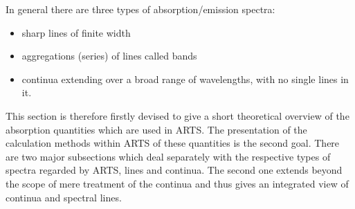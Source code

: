 \def\alphacpl{\alpha^{\mbox{\rm \small CP98}}_{\mbox{\small $\ell$}}} 
%
\def\alphampmoc{\alpha^{\mbox{\rm \small MPM87}}_{\rm c}} 
\def\alphampmmc{\alpha^{\mbox{\rm \small MPM89}}_{\rm c}} 
\def\alphampmnc{\alpha^{\mbox{\rm \small MPM93}}_{\rm c}} 
\def\alphapwrc{\alpha^{\mbox{\rm \small R98}}_{\rm c}} 
\def\alphacpc{\alpha^{\mbox{\rm \small CP98}}_{\rm c}} 
%
\def\gamk{\gamma_{\mbox{\rm \small k}}}
\def\gamc{\gamma_{\mbox{\rm \small c}}}
%
\def\ws{w_{\mbox{\rm \small s,k}}}
\def\xs{x_{\mbox{\rm \small s,k}}}
\def\wf{w_{\mbox{\rm \small f,k}}}
\def\xf{x_{\mbox{\rm \small f,k}}}
%
\def\wn{\bar{\nu}}
\def\nucc{\nu_{\mbox{\rm \small c}}}
\def\nucut{\nu_{\mbox{\rm \small cutoff}}}
\def\nuo{\nu_{\mbox{\rm \small 0}}}
\def\nuk{\nu_{\mbox{\rm \small k}}}
%
\def\shape{F(\nu,\nuk)}
\def\shapec{F_{c}(\nu,\nuk)}
\def\shapefp{f_{c}(\nu,+\nuk)}
\def\shapefm{f_{c}(\nu,-\nuk)}
\def\shapefpm{f_{c}(\nu,\pm\nuk)}
\def\inten{S_{\mbox{\rm \small k}}(T)}
\def\inteno{S_{\mbox{\rm \small k}}(300\,K)}
\def\intencp{S_{\mbox{\rm \small 0}}(T)}
%
\def\cx{C_{\mbox{\rm \small x}}}
\def\cs{C_{\mbox{\rm \small H}_{2}\mbox{\rm \small O}}} 
\def\cf{C_{\mbox{\rm N}_{2}}} 
\def\cxo{C^{\mbox{\rm o}}_{\mbox{\rm \small X}}} 
\def\cso{C^{\mbox{\rm o}}_{\mbox{\rm \small H}_{2}\mbox{\rm \small O}}} 
\def\cfo{C^{\mbox{\rm o}}_{\mbox{\rm \small N}_{2}}} 
\def\cao{C^{\mbox{\rm o}}_{\mbox{\rm \small air}}}
\def\cdo{C^{\mbox{\rm o}}_{\mbox{\rm \small d}}}
\def\xx{{\rm n}_{\mbox{\rm \small  x}}} 
\def\xs{{\rm n}_{\mbox{\rm \small  s}}} 
\def\xf{{\rm n}_{\mbox{\rm \small  f}}} 
\def\xd{{\rm n}_{\mbox{\rm \small  d}}}
%


                                          

In general there are three types of absorption/emission spectra:
\begin{itemize}
\item sharp lines of finite width
\item aggregations (series) of lines called bands
\item continua extending over a broad range of wavelengths, with
      no single lines in it.
\end{itemize}
This section is therefore firstly devised to give a short theoretical
overview of the absorption quantities which are used in ARTS. The
presentation of the calculation methods within ARTS of these
quantities is the second goal. There are two major subsections which
deal separately with the respective types of spectra regarded by ARTS,
lines and continua.  The second one extends beyond the scope of mere
treatment of the continua and thus gives an integrated view of
continua and spectral lines.

